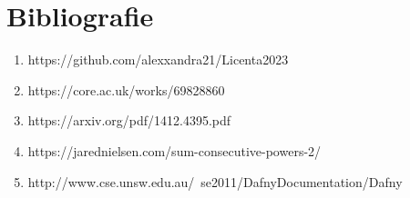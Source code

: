 \chapter*{Bibliografie} 

\begin{enumerate}
	\item https://github.com/alexxandra21/Licenta2023
	\item https://core.ac.uk/works/69828860
	\item https://arxiv.org/pdf/1412.4395.pdf
	\item https://jarednielsen.com/sum-consecutive-powers-2/
	\item http://www.cse.unsw.edu.au/~se2011/DafnyDocumentation/Dafny%
\end{enumerate}